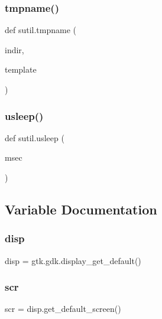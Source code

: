 \mbox{\label{namespacesutil_a05bce0450fed5500a47807276f44b7af}} 
\subsubsection{\texorpdfstring{tmpname()}{tmpname()}}
{\footnotesize\ttfamily def sutil.\+tmpname (\begin{DoxyParamCaption}\item[{}]{indir,  }\item[{}]{template }\end{DoxyParamCaption})}

\mbox{\label{namespacesutil_a85b8fdf62f2f3a32f0492bd3ccefa210}} 
\subsubsection{\texorpdfstring{usleep()}{usleep()}}
{\footnotesize\ttfamily def sutil.\+usleep (\begin{DoxyParamCaption}\item[{}]{msec }\end{DoxyParamCaption})}



\subsection{Variable Documentation}
\mbox{\label{namespacesutil_a4e72583d972515f4f5e30d98ce1eb739}} 
\subsubsection{\texorpdfstring{disp}{disp}}
{\footnotesize\ttfamily disp = gtk.\+gdk.\+display\+\_\+get\+\_\+default()}

\mbox{\label{namespacesutil_ad75a267a1da457e846243e557b3ac5bb}} 
\subsubsection{\texorpdfstring{scr}{scr}}
{\footnotesize\ttfamily scr = disp.\+get\+\_\+default\+\_\+screen()}

